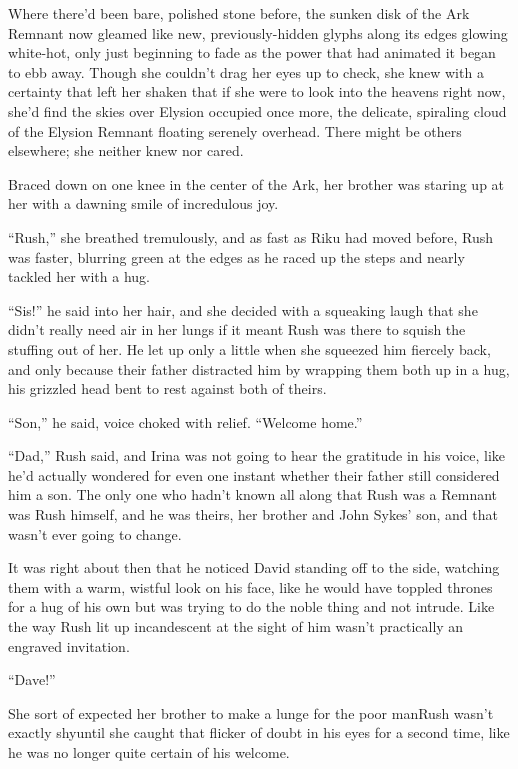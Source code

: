 Where there'd been bare, polished stone before, the sunken disk of the Ark Remnant now gleamed like new, previously-hidden glyphs along its edges glowing white-hot, only just beginning to fade as the power that had animated it began to ebb away. Though she couldn't drag her eyes up to check, she knew with a certainty that left her shaken that if she were to look into the heavens right now, she'd find the skies over Elysion occupied once more, the delicate, spiraling cloud of the Elysion Remnant floating serenely overhead. There might be others elsewhere; she neither knew nor cared.

Braced down on one knee in the center of the Ark, her brother was staring up at her with a dawning smile of incredulous joy.

``Rush,'' she breathed tremulously, and as fast as Riku had moved before, Rush was faster, blurring green at the edges as he raced up the steps and nearly tackled her with a hug.

``Sis!'' he said into her hair, and she decided with a squeaking laugh that she didn't really need air in her lungs if it meant Rush was there to squish the stuffing out of her. He let up only a little when she squeezed him fiercely back, and only because their father distracted him by wrapping them both up in a hug, his grizzled head bent to rest against both of theirs.

``Son,'' he said, voice choked with relief. ``Welcome home.''

``Dad,'' Rush said, and Irina was not going to hear the gratitude in his voice, like he'd actually wondered for even one instant whether their father still considered him a son. The only one who hadn't known all along that Rush was a Remnant was Rush himself, and he was theirs, her brother and John Sykes' son, and that wasn't ever going to change.

It was right about then that he noticed David standing off to the side, watching them with a warm, wistful look on his face, like he would have toppled thrones for a hug of his own but was trying to do the noble thing and not intrude. Like the way Rush lit up incandescent at the sight of him wasn't practically an engraved invitation.

``Dave!''

She sort of expected her brother to make a lunge for the poor man\textemdash Rush wasn't exactly shy\textemdash until she caught that flicker of doubt in his eyes for a second time, like he was no longer quite certain of his welcome.

